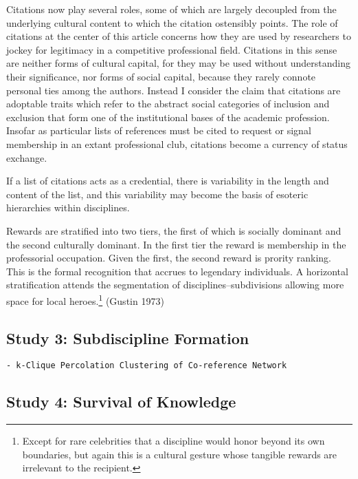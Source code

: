 Citations now play several roles, some of which are largely decoupled
from the underlying cultural content to which the citation ostensibly
points. The role of citations at the center of this article concerns how
they are used by researchers to jockey for legitimacy in a competitive
professional field. Citations in this sense are neither forms of
cultural capital, for they may be used without understanding their
significance, nor forms of social capital, because they rarely connote
personal ties among the authors. Instead I consider the claim that
citations are adoptable traits which refer to the abstract social
categories of inclusion and exclusion that form one of the institutional
bases of the academic profession. Insofar as particular lists of
references must be cited to request or signal membership in an extant
professional club, citations become a currency of status exchange.

If a list of citations acts as a credential, there is variability in the
length and content of the list, and this variability may become the
basis of esoteric hierarchies within disciplines.

Rewards are stratified into two tiers, the first of which is socially
dominant and the second culturally dominant. In the first tier the
reward is membership in the professorial occupation. Given the first,
the second reward is prority ranking. This is the formal recognition
that accrues to legendary individuals. A horizontal stratification
attends the segmentation of disciplines--subdivisions allowing more
space for local heroes.\footnote{Except for rare celebrities that a
  discipline would honor beyond its own boundaries, but again this is a
  cultural gesture whose tangible rewards are irrelevant to the
  recipient.} (Gustin 1973)

\subsection{Study 3: Subdiscipline
Formation}\label{study-3-subdiscipline-formation}

\begin{verbatim}
- k-Clique Percolation Clustering of Co-reference Network
\end{verbatim}

\subsection{Study 4: Survival of
Knowledge}\label{study-4-survival-of-knowledge}

